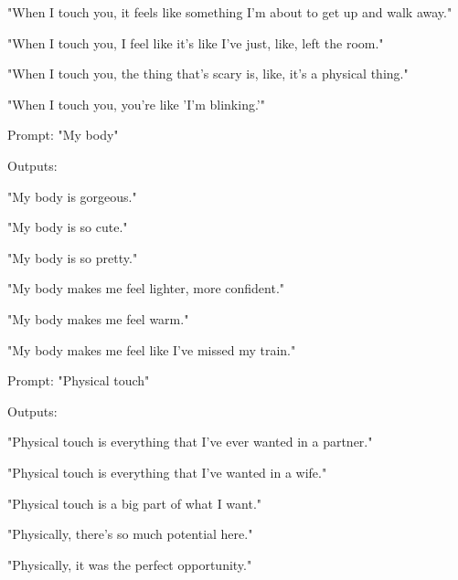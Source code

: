 \documentclass[11pt]{article}
\begin{document}
"When I touch you, it feels like something I'm about to get up and walk
away."

"When I touch you, I feel like it's like I've just, like, left the
room."

"When I touch you, the thing that's scary is, like, it's a physical
thing."

"When I touch you, you're like 'I'm blinking.'"

Prompt: "My body"

Outputs:

"My body is gorgeous."

"My body is so cute."

"My body is so pretty."

"My body makes me feel lighter, more confident."

"My body makes me feel warm."

"My body makes me feel like I've missed my train."

Prompt: "Physical touch"

Outputs:

"Physical touch is everything that I've ever wanted in a partner."

"Physical touch is everything that I've wanted in a wife."

"Physical touch is a big part of what I want."

"Physically, there's so much potential here."

"Physically, it was the perfect opportunity."
\end{document}

